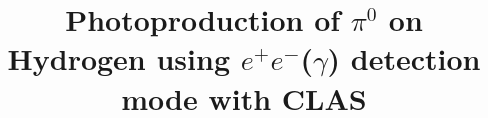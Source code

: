 \documentclass[aps,prc,twocolumn,floatfix,showpacs,preprintnumbers,amsmath,amssymb,superscriptaddress,linenumbers]{revtex4-1}
\def\epemT{$ e^+e^-  $}
\begin{document}
\preprint{}

\title{Photoproduction of $\pi^0$ on Hydrogen using \epemT($\gamma$) detection mode with CLAS}


\newcommand*{\ODU}{Old Dominion University, Norfolk, VA 23529, USA}
\newcommand*{\IKP}{Institut f\"ur Kernphysik, Forschungszentrum J\"ulich, 
	52424 J\"ulich, Germany}
\newcommand*{\BOCHUM}{Institut f\"ur Experimentalphysik I, Ruhr-–Universit\"at 
	Bochum, 44780 Bochum, Germany}
\newcommand*{\JARA}{ JARA–FAME, J\"ulich Aachen Research Alliance, 
	Forschungszentrum J\"ulich, 52425 J\"ulich, and RWTH Aachen, 52056 
	Aachen, Germany}
\newcommand*{\KYUNGPOOK} {Kyungpook National University, 702-701, Daegu, 
	Republic of Korea}
\newcommand*{\INR}{Institute for Nuclear Research, 117312, Moscow, Russia}
\newcommand*{\CUA}{Catholic University of America, Washington, DC 20064} 
\newcommand*{\JLAB}{Thomas Jefferson National Accelerator Facility, Newport 
	News, VA 23606}
\newcommand*{\UVA}{University of Virginia, Charlottesville, VA 22904, USA}
\newcommand*{\CMU}{Carnegie Mellon University, Pittsburg, PA 15213, USA}
\end{document}
